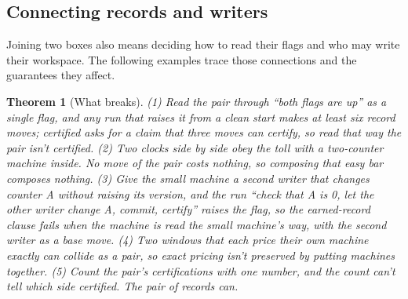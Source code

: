 \documentclass[11pt,twoside]{article}
\theoremstyle{thielethm}
\newtheorem{theorem}{Theorem}[section]
\theoremstyle{thieledef}
\theoremstyle{thieledef}
\theoremstyle{thieledef}
\theoremstyle{thielethm}
\theoremstyle{thieleobs}
\theoremstyle{thielethm}
\begin{document}
\subsection{Connecting records and writers}

Joining two boxes also means deciding how to read their flags and who may write their
workspace. The following examples trace those connections and the guarantees they affect.

\begin{theorem}[What breaks]\label{thm:parts-breaks}
(1) Read the pair through ``both flags are up'' as a single flag, and any run that raises it from
a clean start makes at least six record moves; certified asks for a claim
that three moves can certify, so read that way the pair isn't certified. (2) Two clocks side by side
obey the toll with a two-counter machine inside. No move of the pair costs nothing, so composing that
easy bar composes nothing.
(3) Give the small machine a second writer that changes counter A without raising its version, and
the run ``check that A is 0, let the other writer change A, commit, certify'' raises the flag, so
the earned-record
clause fails when the machine is read the small machine's way, with the second writer as a base move. (4) Two windows that each price their own machine exactly can
collide as a pair, so exact pricing isn't preserved by putting machines together. (5) Count the
pair's certifications with one number, and the count can't tell which side certified. The pair of
records can.
\end{theorem}
\end{document}
